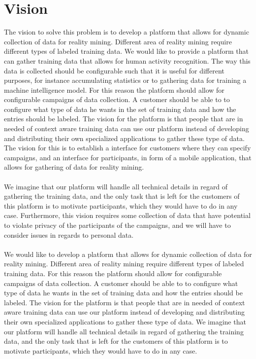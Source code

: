 \section{Vision}
\label{sec:vision}
The vision to solve this problem is to develop a platform that allows for dynamic collection of data for reality mining. Different area of reality mining require different types of labeled training data. We would like to provide a platform that can gather training data that allows for human activity recognition. The way this data is collected should be configurable such that it is useful for different purposes, for instance accumulating statistics or to gathering data for training a machine intelligence model. For this reason the platform should allow for configurable campaigns of data collection. A customer should be able to to configure what type of data he wants in the set of training data and how the entries should be labeled. The vision for the platform is that people that are in needed of context aware training data can use our platform instead of developing and distributing their own specialized applications to gather these type of data. The vision for this is to establish a interface for customers where they can specify campaigns, and an interface for participants, in form of a mobile application, that allows for gathering of data for reality mining.
\\\\
We imagine that our platform will handle all technical details in regard of gathering the training data, and the only task that is left for the customers of this platform is to motivate participants, which they would have to do in any case. Furthermore, this vision requires some collection of data that have potential to violate privacy of the participants of the campaigns, and we will have to consider issues in regards to personal data.
\\\\
We would like to develop a platform that allows for dynamic collection of data for reality mining. Different area of reality mining require different types of labeled training data. For this reason the platform should allow for configurable campaigns of data collection. A customer should be able to to configure what type of data he wants in the set of training data and how the entries should be labeled. The vision for the platform is that people that are in needed of context aware training data can use our platform instead of developing and distributing their own specialized applications to gather these type of data. We imagine that our platform will handle all technical details in regard of gathering the training data, and the only task that is left for the customers of this platform is to motivate participants, which they would have to do in any case.

